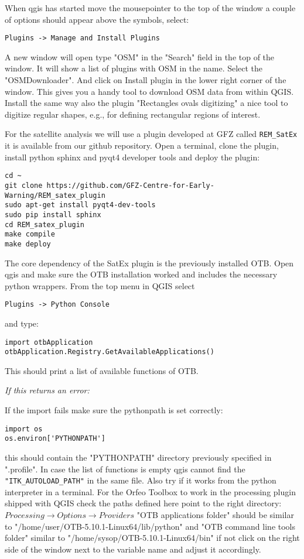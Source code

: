 \documentclass{article}
\begin{document}
When qgis has started move the mousepointer to the top of the window
a couple of options should appear above the symbols, select:
\begin{verbatim}
Plugins -> Manage and Install Plugins
\end{verbatim}
A new window will open type "OSM" in the "Search" field in the top 
of the window. It will show a list of plugins with OSM in the name.
Select the "OSMDownloader". And click on Install plugin 
in the lower right corner of the window. 
This gives you a handy tool to download
OSM data from within QGIS. Install the same way
also the plugin "Rectangles ovals digitizing" a nice tool to digitize
regular shapes, e.g., for defining rectangular regions of interest.

For the satellite analysis we will use a plugin developed at GFZ
called \verb|REM_SatEx| it is available from our github repository.
Open a terminal, clone the plugin, install python sphinx and
pyqt4 developer tools and deploy the plugin:
\begin{verbatim}
cd ~
git clone https://github.com/GFZ-Centre-for-Early-Warning/REM_satex_plugin
sudo apt-get install pyqt4-dev-tools
sudo pip install sphinx
cd REM_satex_plugin
make compile
make deploy
\end{verbatim}

The core dependency of the SatEx plugin is the previously installed 
OTB.
Open qgis and make sure the OTB installation worked 
and includes the necessary python wrappers. From
the top menu in QGIS select
\begin{verbatim}
Plugins -> Python Console
\end{verbatim}
and type:
\begin{verbatim}
import otbApplication
otbApplication.Registry.GetAvailableApplications()
\end{verbatim}
This should print a list of available functions of OTB. 

\textit{If this returns an error:}

If the import fails make sure the pythonpath is set correctly:
\begin{verbatim}
import os
os.environ['PYTHONPATH']
\end{verbatim}
this should contain the "PYTHONPATH" directory previously 
specified in ".profile".
In case the list of functions is empty qgis cannot find the
\verb|"ITK_AUTOLOAD_PATH"| in the same file. Also try if
it works from the python interpreter in a terminal. 
For the Orfeo Toolbox to work in the processing plugin shipped with QGIS
check the paths defined here point to the right directory:
$Processing \rightarrow Options \rightarrow Providers$
"OTB applications folder" should be similar to "/home/user/OTB-5.10.1-Linux64/lib/python" and "OTB command line tools folder" similar to "/home/sysop/OTB-5.10.1-Linux64/bin" if not click on the right side of the window next to the variable name and adjust it accordingly.
\end{document}
